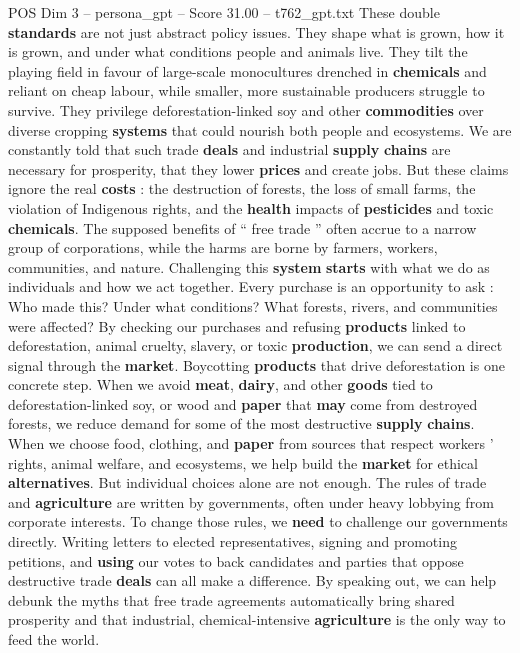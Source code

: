 \begin{textsample}{POS Dim 3 – persona\_gpt – Score 31.00 – t762\_gpt.txt}
These double \textbf{standards} are not just abstract policy issues.
They shape what is grown, how it is grown, and under what conditions people and animals live.
They tilt the playing field in favour of large-scale monocultures drenched in \textbf{chemicals} and reliant on cheap labour, while smaller, more sustainable producers struggle to survive.
They privilege deforestation-linked soy and other \textbf{commodities} over diverse cropping \textbf{systems} that could nourish both people and ecosystems.
We are constantly told that such trade \textbf{deals} and industrial \textbf{supply} \textbf{chains} are necessary for prosperity, that they lower \textbf{prices} and create jobs.
But these claims ignore the real \textbf{costs} : the destruction of forests, the loss of small farms, the violation of Indigenous rights, and the \textbf{health} impacts of \textbf{pesticides} and toxic \textbf{chemicals}.
The supposed benefits of “ free trade ” often accrue to a narrow group of corporations, while the harms are borne by farmers, workers, communities, and nature.
Challenging this \textbf{system} \textbf{starts} with what we do as individuals and how we act together.
Every purchase is an opportunity to ask : Who made this?
Under what conditions?
What forests, rivers, and communities were affected?
By checking our purchases and refusing \textbf{products} linked to deforestation, animal cruelty, slavery, or toxic \textbf{production}, we can send a direct signal through the \textbf{market}.
Boycotting \textbf{products} that drive deforestation is one concrete step.
When we avoid \textbf{meat}, \textbf{dairy}, and other \textbf{goods} tied to deforestation-linked soy, or wood and \textbf{paper} that \textbf{may} come from destroyed forests, we reduce demand for some of the most destructive \textbf{supply} \textbf{chains}.
When we choose food, clothing, and \textbf{paper} from sources that respect workers ’ rights, animal welfare, and ecosystems, we help build the \textbf{market} for ethical \textbf{alternatives}.
But individual choices alone are not enough.
The rules of trade and \textbf{agriculture} are written by governments, often under heavy lobbying from corporate interests.
To change those rules, we \textbf{need} to challenge our governments directly.
Writing letters to elected representatives, signing and promoting petitions, and \textbf{using} our votes to back candidates and parties that oppose destructive trade \textbf{deals} can all make a difference.
By speaking out, we can help debunk the myths that free trade agreements automatically bring shared prosperity and that industrial, chemical-intensive \textbf{agriculture} is the only way to feed the world.

\end{textsample}

